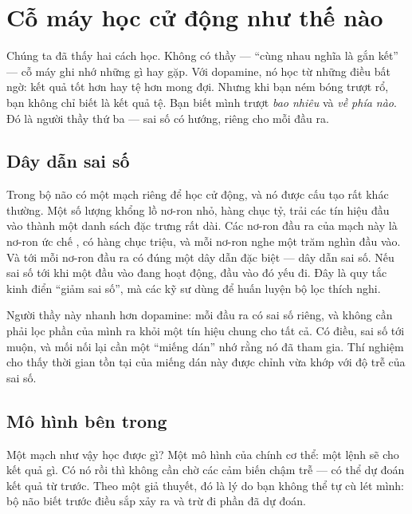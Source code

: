 \chapter{Cỗ máy học cử động như thế nào}

Chúng ta đã thấy hai cách học. Không có thầy --- ``cùng nhau nghĩa là gắn kết'' --- cỗ máy ghi nhớ những gì hay gặp. Với dopamine, nó học từ những điều bất ngờ: kết quả tốt hơn hay tệ hơn mong đợi. Nhưng khi bạn ném bóng trượt rổ, bạn không chỉ biết là kết quả tệ. Bạn biết mình trượt \emph{bao nhiêu} và \emph{về phía nào}. Đó là người thầy thứ ba --- sai số có hướng, riêng cho mỗi đầu ra.

\section*{Dây dẫn sai số}

Trong bộ não có một mạch riêng để học cử động, và nó được cấu tạo rất khác thường. Một số lượng khổng lồ nơ-ron  nhỏ, hàng chục tỷ, trải các tín hiệu đầu vào thành một danh sách đặc trưng rất dài. Các nơ-ron đầu ra của mạch này là nơ-ron ức chế , có hàng chục triệu, và mỗi nơ-ron nghe một trăm nghìn đầu vào. Và tới mỗi nơ-ron đầu ra có đúng một dây dẫn đặc biệt --- dây dẫn sai số. Nếu sai số tới khi một đầu vào đang hoạt động, đầu vào đó yếu đi. Đây là quy tắc kinh điển ``giảm sai số'', mà các kỹ sư dùng để huấn luyện bộ lọc thích nghi.


Người thầy này nhanh hơn dopamine: mỗi đầu ra có sai số riêng, và không cần phải lọc phần của mình ra khỏi một tín hiệu chung cho tất cả. Có điều, sai số tới muộn, và mối nối lại cần một ``miếng dán'' nhớ rằng nó đã tham gia. Thí nghiệm cho thấy thời gian tồn tại của miếng dán này được chỉnh vừa khớp với độ trễ của sai số.

\section*{Mô hình bên trong}

Một mạch như vậy học được gì? Một mô hình của chính cơ thể: một lệnh sẽ cho kết quả gì. Có nó rồi thì không cần chờ các cảm biến chậm trễ --- có thể dự đoán kết quả từ trước. Theo một giả thuyết, đó là lý do bạn không thể tự cù lét mình: bộ não biết trước điều sắp xảy ra và trừ đi phần đã dự đoán.

